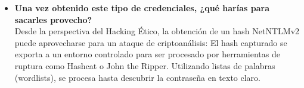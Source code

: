 \begin{itemize}
	\item \textbf{Una vez obtenido este tipo de credenciales, ¿qué harías para sacarles provecho?}\\
	Desde la perspectiva del Hacking Ético, la obtención de un hash NetNTLMv2 puede aprovecharse para un ataque de criptoanálisis: El hash capturado se exporta a un entorno controlado para ser procesado por herramientas de ruptura como Hashcat o John the Ripper. Utilizando listas de palabras (wordlists), se procesa hasta descubrir la contraseña en texto claro.
	
\end{itemize}
